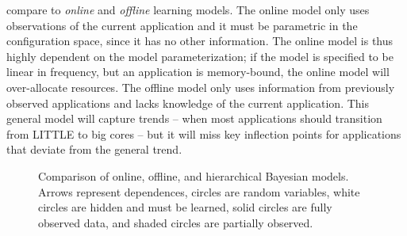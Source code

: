  compare \SYSTEM{} to \emph{online} and
\emph{offline} learning models.  The online model only uses
observations of the current application and it must be parametric in
the configuration space, since it has no other information. The online
model is thus highly dependent on the model parameterization; \eg{} if
the model is specified to be linear in frequency, but an application
is memory-bound, the online model will over-allocate resources.  The
offline model only uses information from previously observed
applications and lacks knowledge of the current application.  This
general model will capture trends -- \eg{} when most applications
should transition from LITTLE to big cores -- but it will miss key
inflection points for applications that deviate from the general
trend.

\begin{figure}

  \caption{ Comparison of online, offline, and hierarchical Bayesian
    models.  Arrows represent dependences, circles are random
    variables, white circles are hidden and must be learned, solid
    circles are fully observed data, and shaded circles are partially
    observed.}
\label{fig:learning-models}
\end{figure}


